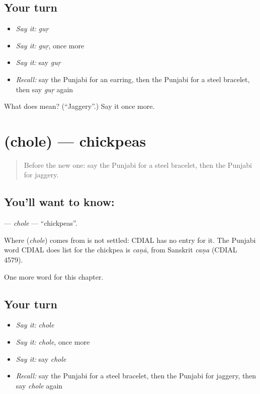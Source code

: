 \subsection*{Your turn}
\begin{itemize}
\raggedright
  \item \emph{Say it:} \emph{guṛ}
  \item \emph{Say it:} \emph{guṛ}, once more
  \item \emph{Say it:} say \emph{guṛ}
  \item \emph{Recall:} say the Punjabi for an earring, then the Punjabi for a steel bracelet, then say \emph{guṛ} again
\end{itemize}

\begin{tcolorbox}[breakable,colback=teal!4,colframe=teal!35!black,title={Before you move on}]
What does  mean? (\textquotedblleft{}Jaggery\textquotedblright{}.) Say it once more.
\end{tcolorbox}
\section[\texorpdfstring{\pa{ਛੋਲੇ} (chole)}{ਛੋਲੇ (chole)}]{ (chole) — chickpeas}

\label{lesson:PA-C121-chole}



\begin{quote}
Before the new one: say the Punjabi for a steel bracelet, then the Punjabi for jaggery.
\end{quote}

\subsection*{You'll want to know: }
\textbf{} — \emph{chole} — \textquotedblleft{}chickpeas\textquotedblright{}.

\begin{cousinweb}
Where \textbf{} (\emph{chole}) comes from is not settled: CDIAL has no entry for it. The Punjabi word CDIAL does list for the chickpea is \emph{caṇā}, from Sanskrit \emph{caṇa} (CDIAL 4579).
\end{cousinweb}

\begin{grammarlens}[title={What you've built}]
One more word for this chapter.
\end{grammarlens}

\subsection*{Your turn}
\begin{itemize}
\raggedright
  \item \emph{Say it:} \emph{chole}
  \item \emph{Say it:} \emph{chole}, once more
  \item \emph{Say it:} say \emph{chole}
  \item \emph{Recall:} say the Punjabi for a steel bracelet, then the Punjabi for jaggery, then say \emph{chole} again
\end{itemize}

